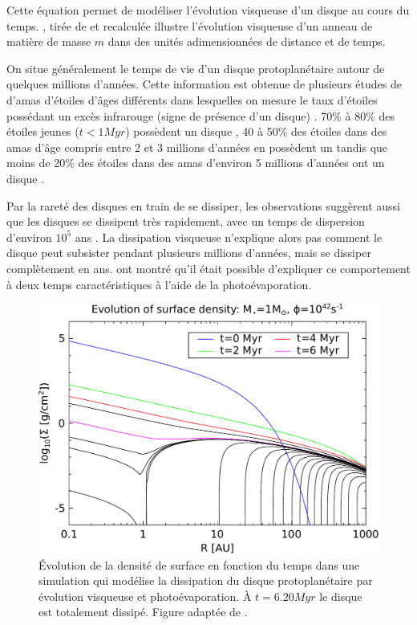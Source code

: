 Cette équation permet de modéliser l'évolution visqueuse d'un disque au cours du temps. , tirée de \cite{pringle1981accretion} et recalculée illustre l'évolution visqueuse d'un anneau de matière de masse $m$ dans des unités adimensionnées de distance et de temps.

\bigskip

On situe généralement le temps de vie d'un disque protoplanétaire autour de quelques millions d'années. Cette information est obtenue de plusieurs études de d'amas d'étoiles d'âges différents dans lesquelles on mesure le taux d'étoiles possédant un excès infrarouge (signe de présence d'un disque) \citep{williams2011protoplanetary}. 70\% à 80\% des étoiles jeunes ($t<1\unit{Myr}$) possèdent un disque \citep{winston2007combined, gutermuth2008spitzer}, 40 à 50\% des étoiles dans des amas d'âge compris entre 2 et 3 millions d'années en possèdent un \citep{lada2006spitzer, sung2009spitzer} tandis que moins de 20\% des étoiles dans des amas d'environ 5 millions d'années ont un disque \citep{currie2009last}. 

Par la rareté des disques en train de se dissiper, les observations suggèrent aussi que les disques se dissipent très rapidement, avec un temps de dispersion d'environ $10^5$ ans \citep{simon1995disk, wolk1996search}. La dissipation visqueuse n'explique alors pas comment le disque peut subsister pendant plusieurs millions d'années, mais se dissiper complètement en  ans. \cite{clarke2001dispersal} ont montré qu'il était possible d'expliquer ce comportement à deux temps caractéristiques à l'aide de la photoévaporation. 

\begin{figure}[htbp]
\centering
\includegraphics[width=0.65\linewidth]{figure/disk_dispersion.pdf}
\caption{Évolution de la densité de surface en fonction du temps dans une simulation qui modélise la dissipation du disque protoplanétaire par évolution visqueuse et photoévaporation. À $t=6.20\unit{Myr}$ le disque est totalement dissipé. Figure adaptée de \cite{alexander2006photoevaporation}.}\label{fig:disk_dispersion}
\end{figure}

